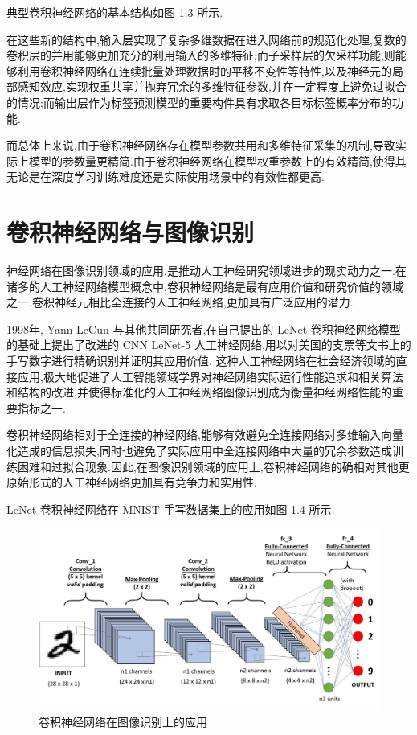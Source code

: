 典型卷积神经网络的基本结构如图 1.3 所示.

在这些新的结构中,输入层实现了复杂多维数据在进入网络前的规范化处理,复数的卷积层的并用能够更加充分的利用输入的多维特征;而子采样层的欠采样功能,则能够利用卷积神经网络在连续批量处理数据时的平移不变性等特性,以及神经元的局部感知效应,实现权重共享并抛弃冗余的多维特征参数\cite{cnnyoushi3},并在一定程度上避免过拟合的情况;而输出层作为标签预测模型的重要构件具有求取各目标标签概率分布的功能.

而总体上来说,由于卷积神经网络存在模型参数共用和多维特征采集的机制,导致实际上模型的参数量更精简.由于卷积神经网络在模型权重参数上的有效精简,使得其无论是在深度学习训练难度还是实际使用场景中的有效性都更高\cite{cnnyoushi}.

\section{卷积神经网络与图像识别}

神经网络在图像识别领域的应用,是推动人工神经研究领域进步的现实动力之一.在诸多的人工神经网络模型概念中,卷积神经网络是最有应用价值和研究价值的领域之一.卷积神经元相比全连接的人工神经网络,更加具有广泛应用的潜力.

1998年, Yann LeCun 与其他共同研究者,在自己提出的 LeNet 卷积神经网络模型的基础上提出了改进的 CNN LeNet-5 人工神经网络,用以对美国的支票等文书上的手写数字进行精确识别\cite{lenet5use}并证明其应用价值.
这种人工神经网络在社会经济领域的直接应用,极大地促进了人工智能领域学界对神经网络实际运行性能追求和相关算法和结构的改进,并使得标准化的人工神经网络图像识别成为衡量神经网络性能的重要指标之一.

卷积神经网络相对于全连接的神经网络,能够有效避免全连接网络对多维输入向量化造成的信息损失,同时也避免了实际应用中全连接网络中大量的冗余参数造成训练困难和过拟合现象.因此,在图像识别领域的应用上,卷积神经网络的确相对其他更原始形式的人工神经网络更加具有竞争力和实用性.

LeNet 卷积神经网络在 MNIST 手写数据集上的应用如图 1.4 所示.

\begin{figure}
	\centering
	\includegraphics[scale=0.2]{Figures/CNN2.jpg}
	\caption{卷积神经网络在图像识别上的应用}
\end{figure}

